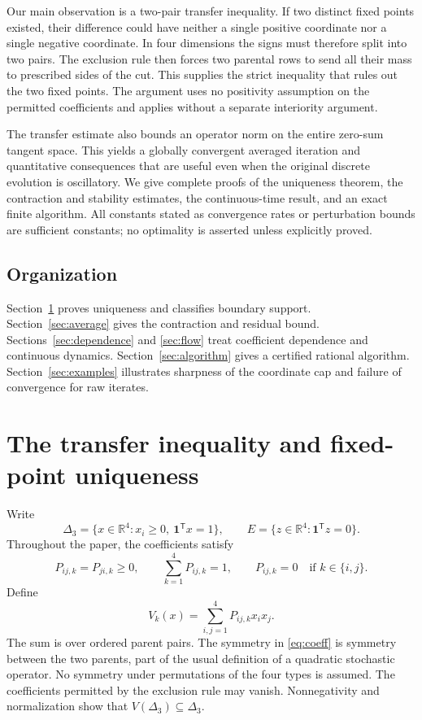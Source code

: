 \documentclass[11pt]{amsart}
\theoremstyle{definition}
\newcommand{\R}{\mathbb R}
\newcommand{\D}{\Delta_3}
\newcommand{\one}{\mathbf 1}
\begin{document}
Our main observation is a two-pair transfer inequality. If two distinct fixed points existed, their difference could have neither a single positive coordinate nor a single negative coordinate. In four dimensions the signs must therefore split into two pairs. The exclusion rule then forces two parental rows to send all their mass to prescribed sides of the cut. This supplies the strict inequality that rules out the two fixed points. The argument uses no positivity assumption on the permitted coefficients and applies without a separate interiority argument.

The transfer estimate also bounds an operator norm on the entire zero-sum tangent space. This yields a globally convergent averaged iteration and quantitative consequences that are useful even when the original discrete evolution is oscillatory. We give complete proofs of the uniqueness theorem, the contraction and stability estimates, the continuous-time result, and an exact finite algorithm. All constants stated as convergence rates or perturbation bounds are sufficient constants; no optimality is asserted unless explicitly proved.

\subsection*{Organization}
Section~\ref{sec:unique} proves uniqueness and classifies boundary support. Section~\ref{sec:average} gives the contraction and residual bound. Sections~\ref{sec:dependence} and \ref{sec:flow} treat coefficient dependence and continuous dynamics. Section~\ref{sec:algorithm} gives a certified rational algorithm. Section~\ref{sec:examples} illustrates sharpness of the coordinate cap and failure of convergence for raw iterates.

\section{The transfer inequality and fixed-point uniqueness}\label{sec:unique}
Write
\[
\D=\{x\in\R^4:x_i\ge0,\ \one^{\mathsf T}x=1\},
\qquad E=\{z\in\R^4:\one^{\mathsf T}z=0\}.
\]
Throughout the paper, the coefficients satisfy
\begin{equation}\label{eq:coeff}
 P_{ij,k}=P_{ji,k}\ge0,\qquad
 \sum_{k=1}^4P_{ij,k}=1,\qquad
 P_{ij,k}=0\quad\text{if }k\in\{i,j\}.
\end{equation}
Define
\begin{equation}\label{eq:V}
 V_k(x)=\sum_{i,j=1}^4P_{ij,k}x_ix_j.
\end{equation}
The sum is over ordered parent pairs. The symmetry in \eqref{eq:coeff} is symmetry between the two parents, part of the usual definition of a quadratic stochastic operator. No symmetry under permutations of the four types is assumed. The coefficients permitted by the exclusion rule may vanish. Nonnegativity and normalization show that $V(\D)\subseteq\D$.
\end{document}

